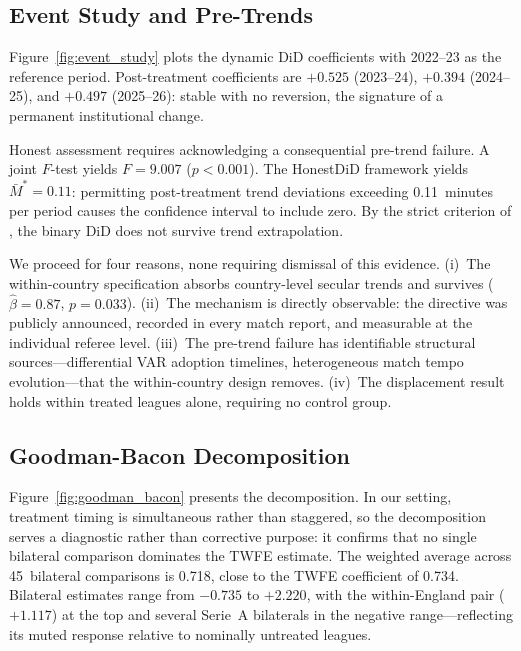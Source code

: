 \subsection{Event Study and Pre-Trends}
\label{subsec:event_study}

Figure~\ref{fig:event_study} plots the dynamic DiD coefficients with
2022--23 as the reference period. Post-treatment coefficients are
$+0.525$ (2023--24), $+0.394$ (2024--25), and $+0.497$ (2025--26):
stable with no reversion, the signature of a permanent institutional
change.

Honest assessment requires acknowledging a consequential pre-trend
failure. A joint $F$-test yields $F = 9.007$ ($p < 0.001$). The
\citet{rambachan2023more} HonestDiD framework yields $\bar{M}^* = 0.11$:
permitting post-treatment trend deviations exceeding 0.11~minutes per
period causes the confidence interval to include zero. By the strict
criterion of \citet{roth2022pretest}, the binary DiD does not survive
trend extrapolation.

We proceed for four reasons, none requiring dismissal of this evidence.
(i)~The within-country specification absorbs country-level secular
trends and survives ($\hat{\beta} = 0.87$, $p = 0.033$).
(ii)~The mechanism is directly observable: the directive was publicly
announced, recorded in every match report, and measurable at the
individual referee level. (iii)~The pre-trend failure has identifiable
structural sources---differential VAR adoption timelines,
heterogeneous match tempo evolution---that the within-country design
removes. (iv)~The displacement result holds within treated leagues
alone, requiring no control group.


\subsection{Goodman-Bacon Decomposition}
\label{subsec:bacon}

Figure~\ref{fig:goodman_bacon} presents the
\citet{goodmanbacon2021difference} decomposition. In our setting,
treatment timing is simultaneous rather than staggered, so the
decomposition serves a diagnostic rather than corrective purpose: it
confirms that no single bilateral comparison dominates the TWFE
estimate. The weighted average across 45~bilateral comparisons is
0.718, close to the TWFE coefficient of 0.734. Bilateral estimates
range from $-0.735$ to $+2.220$, with the within-England pair
($+1.117$) at the top and several Serie~A bilaterals in the negative
range---reflecting its muted response relative to nominally untreated
leagues.


